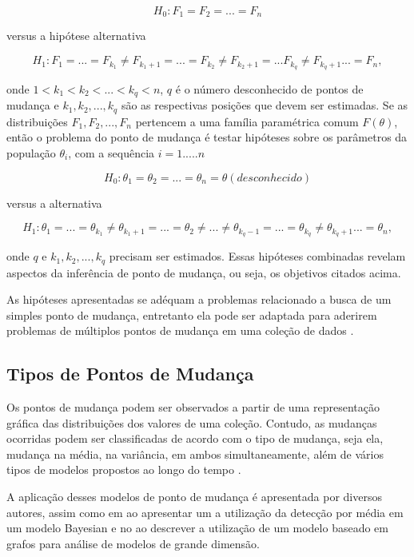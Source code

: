 \[H_0 : F_1 = F_2 = ... = F_n\]

versus a hipótese alternativa

\[H_{1} : F_{1} = ... = F_{k_1}\neq F_{{k_1}+1} = ... = F_{k_2}\neq F_{{k_2}+1} = ... F_{k_q}\neq F_{{k_q}+1} ... = F_{n},\]

onde $1 < k_1 < k_2 < ... < k_q <n$, $q$ é o número desconhecido de pontos de mudança e $k_1, k_2, ..., k_q$ são as respectivas posições que devem ser estimadas. Se as distribuições $F_1, F_2, ..., F_n$ pertencem a uma família paramétrica comum $F(\theta)$, 
então o problema do ponto de mudança é testar hipóteses sobre os parâmetros da população $\theta_i$, com a sequência $i = 1 ..... n$

\[H_0 : \theta_{1} = \theta_{2} = ... = \theta_{n} = \theta (desconhecido)\]

versus a alternativa

\[H_1 : \theta_{1} = ... = \theta_{k_1} \not = \theta_{{k_1}+1} = ... = \theta_{2} \not = ... \not = \theta_{{k_q}-1} = ... = \theta_{k_q} \not = \theta_{{k_q}+1}... = \theta_{n},\]

onde $q$ e $k_1, k_2, ..., k_q$ precisam ser estimados. Essas hipóteses combinadas revelam aspectos da inferência de ponto de mudança, ou seja, os objetivos citados acima. 

As hipóteses apresentadas se adéquam a problemas relacionado a busca de um simples ponto de mudança, entretanto ela pode ser adaptada para aderirem problemas de múltiplos pontos de mudança em uma coleção de dados \cite{Chen1-2000}. 

\subsection{Tipos de Pontos de Mudança} 

Os pontos de mudança podem ser observados a partir de uma representação gráfica das distribuições dos valores de uma coleção. Contudo, as mudanças ocorridas podem ser classificadas de acordo com o tipo de mudança, seja ela, mudança na média, na variância, em ambos simultaneamente, além de vários tipos de modelos propostos ao longo do tempo \cite{Chen2-2000}. 

A aplicação desses modelos de ponto de mudança é apresentada por diversos autores, assim como em \cite{Cheon2010} ao apresentar um a utilização da detecção por média em um modelo Bayesian e no \cite{Shi2017} ao descrever a utilização de um modelo baseado em grafos para análise de modelos de grande dimensão. 


